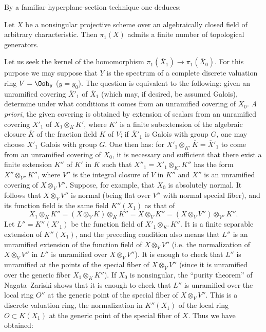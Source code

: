 By a familiar hyperplane-section technique one deduces:

 Let $X$ be a nonsingular projective scheme over an
algebraically closed field of arbitrary characteristic. Then $\pi_1(X)$
admits a finite number of topological generators.

Let us seek the kernel of the homomorphism
$\pi_1(\overline X_1)\longrightarrow\pi_1(\overline X_0)$. For this purpose we
may suppose that $Y$ is the spectrum of a complete discrete valuation ring
$V=\Osh_y$ ($y=y_0$). The question is equivalent to the following: given an
unramified covering $\overline X'_1$ of $\overline X_1$ (which may, if desired,
be assumed Galois), determine under what conditions it comes from an
unramified covering of $X_0$. \textit{A priori}, the given covering is obtained
by extension of scalars from an unramified covering $X'_1$ of
$X_1\otimes_K K'$, where $K'$ is a finite subextension of the algebraic closure
$\overline K$ of the fraction field $K$ of $V$; if $\overline X'_1$ is Galois
with group $G$, one may choose $X'_1$ Galois with group $G$. One then has: for
$X'_1\otimes_{K'}\overline K=\overline X'_1$ to come from an unramified
covering of $X_0$, it is necessary and sufficient that there exist a finite
extension $K''$ of $K'$ in $\overline K$ such that
$X''_1=X'_1\otimes_{K'}K''$ has the form $X''\otimes_{V''}K''$, where $V''$ is
the integral closure of $V$ in $K''$ and $X''$ is an unramified covering of
$X\otimes_VV''$. Suppose, for example, that $X_0$ is absolutely normal. It
follows that $X\otimes_VV''$ is normal (being flat over $V''$ with normal
special fiber), and its function field is the same field $K''(X_1)$ as that of
\[
  X_1\otimes_KK''
  =(X\otimes_VK)\otimes_KK''
  =X\otimes_VK''
  =(X\otimes_VV'')\otimes_{V''}K''.
\]
Let $L''=K''(X'_1)$ be the function field of
$X'_1\otimes_{K'}K''$. It is a finite separable extension of $K''(X_1)$, and
the preceding condition also means that $L''$ is an unramified extension of
the function field of $X\otimes_VV''$ (i.e. the normalization of
$X\otimes_VV''$ in $L''$ is unramified over $X\otimes_VV''$). It is enough to
check that $L''$ is unramified at the points of the special fiber of
$X\otimes_VV''$ (since it is unramified over the generic fiber
$X_1\otimes_KK''$). If $X_0$ is nonsingular, the “purity theorem” of
Nagata--Zariski shows that it is enough to check that $L''$ is unramified over
the local ring $O''$ at the generic point of the special fiber of
$X\otimes_VV''$. This is a discrete valuation ring, the normalization in
$K''(X_1)$ of the local ring $O\subset K(X_1)$ at the generic point of the
special fiber of $X$. Thus we have obtained:

